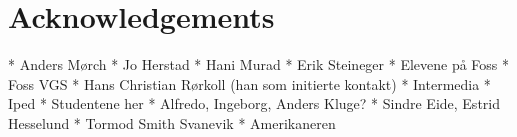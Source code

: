 \section*{Acknowledgements}

* Anders Mørch
* Jo Herstad
* Hani Murad
* Erik Steineger
* Elevene på Foss
* Foss VGS
* Hans Christian Rørkoll (han som initierte kontakt)
* Intermedia
* Iped
* Studentene her
* Alfredo, Ingeborg, Anders Kluge?
* Sindre Eide, Estrid Hesselund
* Tormod Smith Svanevik
* Amerikaneren

\newpage